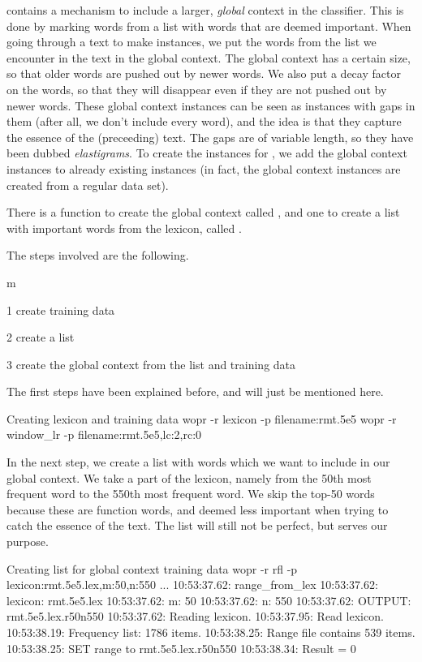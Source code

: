 \documentclass[a4paper,10pt,twoside]{report}
\begin{document}
\Wopr{} contains a mechanism to include a larger, \emph{global}
context in the classifier. This is done by marking words from a list
with words that are deemed important. When going through a text to
make instances, we put the words from the list we encounter in the
text in the global context. The global context has a certain size, so
that older words are pushed out by newer words. We also put a decay
factor on the words, so that they will disappear even if they are not
pushed out by newer words. These global context instances can be seen
as instances with gaps in them (after all, we don't include every
word), and the idea is that they capture the essence of the
(preceeding) text. The gaps are of variable length, so they have been
dubbed \emph{elastigrams}. To create the instances for \Timbl{}, we
add the global context instances to already existing 
instances (in fact, the global context instances are created from a
regular data set).

There is a function to create the global context called
, and one to create a list with important words from the
lexicon, called .

The steps involved are the following.

\begin{varlist}{m}
\item[1] create training data
\item[2] create a list
\item[3] create the global context from the list and training data
\end{varlist}

The first steps have been explained before, and will just be mentioned
here.

\begin{bash}{Creating lexicon and training data}
wopr -r lexicon -p filename:rmt.5e5
wopr -r window_lr -p filename:rmt.5e5,lc:2,rc:0
\end{bash}

In the next step, we create a list with words which we want to include
in our global context. We take a part of the lexicon, namely from the
50th most frequent word to the 550th most frequent word. We skip the
top-50 words because these are function words, and deemed less
important when trying to catch the essence of the text. The list will
still not be perfect, but serves our purpose.

\begin{bash}{Creating list for global context training data}
wopr -r rfl -p lexicon:rmt.5e5.lex,m:50,n:550
...
10:53:37.62: range_from_lex
10:53:37.62:  lexicon: rmt.5e5.lex
10:53:37.62:  m:       50
10:53:37.62:  n:       550
10:53:37.62:  OUTPUT:  rmt.5e5.lex.r50n550
10:53:37.62: Reading lexicon.
10:53:37.95: Read lexicon.
10:53:38.19: Frequency list: 1786 items.
10:53:38.25: Range file contains 539 items.
10:53:38.25: SET range to rmt.5e5.lex.r50n550
10:53:38.34: Result = 0
\end{bash}
\end{document}
